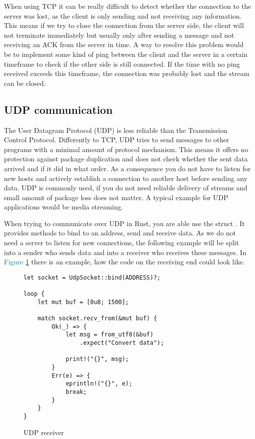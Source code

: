 When using TCP it can be really difficult to detect whether the connection to the server was lost, as the client is
only sending and not receiving any information. This means if we try to close the connection from the server side, the
client will not terminate immediately but usually only after sending a message and not receiving an ACK from the server
in time. A way to resolve this problem would be to implement some kind of ping between the client and the server in a
certain timeframe to check if the other side is still connected. If the time with no ping received exceeds this
timeframe, the connection was probably lost and the stream can be closed.

\subsection{UDP communication}
The User Datagram Protocol (UDP) is less reliable than the Transmission Control Protocol. Differently to TCP, UDP tries
to send messages to other programs with a minimal amount of protocol mechanism. This means it offers no protection
against package duplication and does not check whether the sent data arrived and if it did in what order. As a
consequence you do not have to listen for new hosts and actively establish a connection to another host before sending
any data. UDP is commonly used, if you do not need reliable delivery of streams and small amount of package loss does
not matter. A typical example for UDP applications would be media streaming. \cite{RFC0768}

When trying to communicate over UDP in Rust, you are able use the struct . It provides
methods to bind to an address, send and receive data. As we do not need a server to listen for new connections, the
following example will be split into a sender who sends data and into a receiver who receives these messages. In
\textcolor{teal}{Figure \ref{udp-receiver}} there is an example, how the code on the receiving end could look like.

\begin{figure}[ht]
    \begin{verbatim}
let socket = UdpSocket::bind(ADDRESS)?;

loop {
    let mut buf = [0u8; 1500];

    match socket.recv_from(&mut buf) {
        Ok(_) => {
            let msg = from_utf8(&buf)
                .expect("Convert data");

            print!("{}", msg);
        }
        Err(e) => {
            eprintln!("{}", e);
            break;
        }
    }
}
    \end{verbatim}
    \caption{UDP receiver}
    \label{udp-receiver}
\end{figure}

